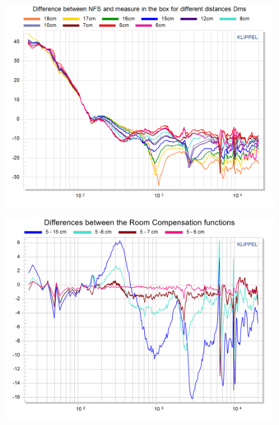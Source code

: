 \documentclass{report}
\begin{document}
\begin{minipage}{0.5\textwidth}
\begin{center}
	\includegraphics[width=0.9\textwidth]{RoomComp/MicPos_Diff_NFS_TRF} 
    \captionsetup{hypcap=false} 
	\label{fig:MicPosDiffNFS}
\end{center}
\end{minipage}
\begin{minipage}{0.5\textwidth}
\begin{center}
	\includegraphics[width=0.9\textwidth]{RoomComp/MicPos_Diff_RefMEas} 
    \captionsetup{hypcap=false} 
	\label{fig:MicPosDiffRC}
\end{center}
\end{minipage}
\vspace{0.1cm}
\end{document}

